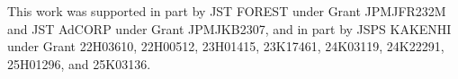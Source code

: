 \small{This work was supported in part by JST FOREST under Grant JPMJFR232M and JST AdCORP under Grant JPMJKB2307, and in part by JSPS KAKENHI under Grant 22H03610, 22H00512, 23H01415, 23K17461, 24K03119, 24K22291, 25H01296, and 25K03136.}